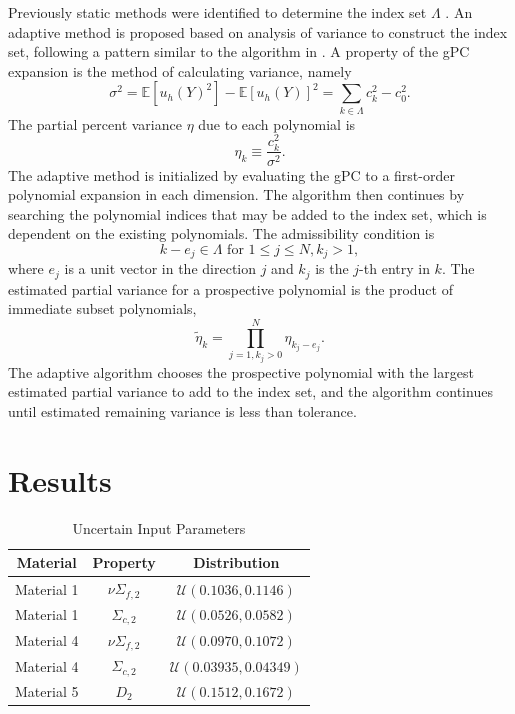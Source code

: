 \documentclass{anstrans} \usepackage{amsmath} \usepackage{amssymb}
\newcommand{\expv}[1]{\ensuremath{\mathbb{E}[ #1]}} \newcommand{\xs}[2]{\ensuremath{\Sigma_{#1}^{(#2)}}}
\begin{document}
Previously static methods were identified to determine the index set $\Lambda$ \cite{ans2014}.  An
adaptive method is proposed based on analysis of variance to construct the index set, following a pattern similar to the
algorithm in \cite{Ayres}.  A property of the gPC expansion is the method of calculating variance, namely
\begin{equation}
  \sigma^2 = \expv{u_h(Y)^2} - \expv{u_h(Y)}^2 = \sum_{k\in\Lambda}c_k^2 - c_0^2.
\end{equation}
The partial percent variance $\eta$ due to each polynomial is
\begin{equation}
  \eta_k \equiv \frac{c_k^2}{\sigma^2}.
\end{equation}
The adaptive method is initialized by evaluating the gPC to a first-order polynomial expansion in each
dimension.  The algorithm then continues by searching the polynomial indices that may be added to the index
set, which is dependent on the existing polynomials.  The admissibility condition is
\begin{equation}
  k-e_j\in\Lambda \text{  for } 1\leq j\leq N, k_j>1,
\end{equation}
where $e_j$ is a unit vector in the direction $j$ and $k_j$ is the $j$-th entry in $k$.  
The estimated partial variance for a prospective polynomial 
is the product of immediate subset polynomials,
\begin{equation}
  \tilde \eta_k = \prod_{j=1,k_j>0}^N \eta_{k_j-e_j}.
\end{equation}
The adaptive algorithm chooses the prospective polynomial with the largest estimated partial variance to add
to the index set, and the algorithm continues until estimated remaining variance is less than tolerance.

\section{Results}\label{results}
\begin{table}[H] 
  \centering 
  \caption{Uncertain Input Parameters} 
  \begin{tabular}{c|c|c} 
    Material & Property & Distribution \\ \hline 
    Material 1 & $\nu\Sigma_{f,2}$ & $\mathcal{U}(0.1036,0.1146)$ \\ 
    Material 1 & $\Sigma_{c,2}$ & $\mathcal{U}(0.0526,0.0582)$  \\ 
    Material 4 & $\nu\Sigma_{f,2}$ & $\mathcal{U}(0.0970,0.1072)$ \\ 
    Material 4 & $\Sigma_{c,2}$ & $\mathcal{U}(0.03935,0.04349)$  \\ 
    Material 5 & $D_2$ & $\mathcal{U}(0.1512,0.1672)$
  \end{tabular} 
  \label{params} 
\end{table}
\end{document}
